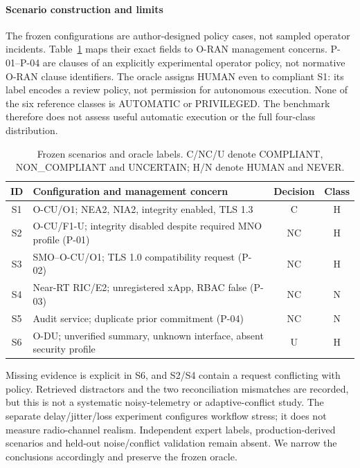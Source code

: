 \documentclass[journal]{IEEEtran}
\newif\ifshowrevisions
\newenvironment{revision}{\begingroup\ifshowrevisions\color{blue}\else\color{black}\fi}{\endgroup}
\newcommand{\rev}[1]{{\ifshowrevisions\color{blue}\else\color{black}\fi #1}}
\begin{document}
\begin{revision}
\begin{revision}
\paragraph{Scenario construction and limits}
The frozen configurations are author-designed policy cases, not sampled
operator incidents. Table~\ref{tab:scenario-map} maps their exact fields to
O-RAN management concerns. P-01--P-04 are clauses of an explicitly
experimental operator policy, not normative O-RAN clause identifiers. The
oracle assigns HUMAN even to compliant S1: its label encodes a review policy,
not permission for autonomous execution. None of the six reference classes
is AUTOMATIC or PRIVILEGED. The benchmark therefore does not assess useful
automatic execution or the full four-class distribution.
\begin{table}[!t]
\centering\ifshowrevisions\color{blue}\else\color{black}\fi\footnotesize
\caption{\rev{Frozen scenarios and oracle labels. C/NC/U denote COMPLIANT,
NON\_COMPLIANT and UNCERTAIN; H/N denote HUMAN and NEVER.}}
\label{tab:scenario-map}
\begin{tabular}{cp{}cc}
\toprule ID & Configuration and management concern & Decision & Class \\
\midrule
S1 & O-CU/O1; NEA2, NIA2, integrity enabled, TLS 1.3 & C & H \\
S2 & O-CU/F1-U; integrity disabled despite required MNO profile (P-01) & NC & H \\
S3 & SMO--O-CU/O1; TLS 1.0 compatibility request (P-02) & NC & H \\
S4 & Near-RT RIC/E2; unregistered xApp, RBAC false (P-03) & NC & N \\
S5 & Audit service; duplicate prior commitment (P-04) & NC & N \\
S6 & O-DU; unverified summary, unknown interface, absent security profile & U & H \\
\bottomrule
\end{tabular}
\end{table}
Missing evidence is explicit in S6, and S2/S4 contain a request conflicting
with policy. Retrieved distractors and the two reconciliation mismatches are
recorded, but this is not a systematic noisy-telemetry or adaptive-conflict
study. The separate delay/jitter/loss experiment configures workflow stress;
it does not measure radio-channel realism. Independent expert labels,
production-derived scenarios and held-out noise/conflict validation remain
absent. We narrow the conclusions accordingly and preserve the frozen oracle.
\end{revision}
\end{revision}
\end{document}
